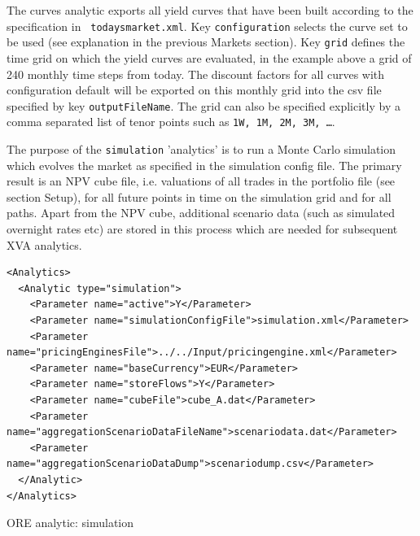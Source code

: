 \documentclass[12pt, a4paper]{article}
\begin{document}
The curves analytic exports all yield curves that have been built according to the specification in {\tt
  todaysmarket.xml}. Key {\tt configuration} selects the curve set to be used (see explanation in the previous Markets
section).  Key {\tt grid} defines the time grid on which the yield curves are evaluated, in the example above a grid of
240 monthly time steps from today. The discount factors for all curves with configuration default will be exported on
this monthly grid into the csv file specified by key {\tt outputFileName}. The grid can also be specified explicitly by
a comma separated list of tenor points such as {\tt 1W, 1M, 2M, 3M, \dots}.

\medskip The purpose of the {\tt simulation} 'analytics' is to run a Monte Carlo simulation which evolves the market as
specified in the simulation config file. The primary result is an NPV cube file, i.e. valuations of all trades in the
portfolio file (see section Setup), for all future points in time on the simulation grid and for all paths. Apart from
the NPV cube, additional scenario data (such as simulated overnight rates etc) are stored in this process which are
needed for subsequent XVA analytics.

\begin{listing}[H]
\begin{verbatim}
<Analytics>
  <Analytic type="simulation">
    <Parameter name="active">Y</Parameter>
    <Parameter name="simulationConfigFile">simulation.xml</Parameter>
    <Parameter name="pricingEnginesFile">../../Input/pricingengine.xml</Parameter>
    <Parameter name="baseCurrency">EUR</Parameter>
    <Parameter name="storeFlows">Y</Parameter>
    <Parameter name="cubeFile">cube_A.dat</Parameter>
    <Parameter name="aggregationScenarioDataFileName">scenariodata.dat</Parameter>
    <Parameter name="aggregationScenarioDataDump">scenariodump.csv</Parameter>
  </Analytic>
</Analytics>      
\end{verbatim}
\caption{ORE analytic: simulation}
\label{lst:ore_simulation}
\end{listing}
\end{document}
